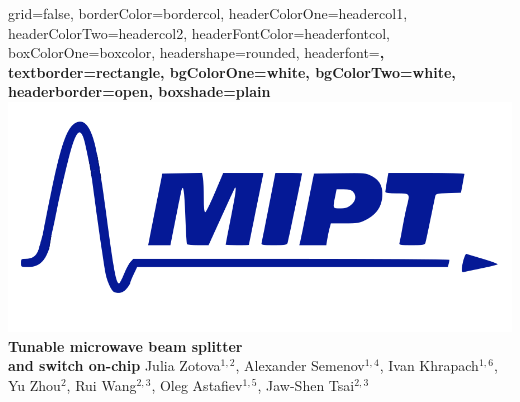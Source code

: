 \documentclass[a0paper,portrait]{baposter}
\begin{document}

\begin{poster}{
grid=false,
borderColor=bordercol, %
headerColorOne=headercol1, %
headerColorTwo=headercol2, %
headerFontColor=headerfontcol, %
boxColorOne=boxcolor, %
headershape=rounded, %
headerfont=\Large\sf\bf, %
textborder=rectangle,
bgColorOne=white, 
bgColorTwo=white,%
headerborder=open, %
boxshade=plain
}
{\includegraphics[scale=0.2]{logom.png}}
%
%
{ \bf  \huge {\vspace{10mm}\\Tunable microwave beam splitter\\\vspace{3mm}and switch on-chip} }
{\vspace{0.5em}  Julia Zotova$^{1, 2}$, Alexander Semenov$^{1,4}$, Ivan Khrapach$^{1, 6}$, Yu Zhou$^{2}$, Rui Wang$^{2, 3}$, Oleg Astafiev$^{1,5}$, Jaw-Shen Tsai$^{2, 3}$\\  %
}
\end{poster}
\end{document}
